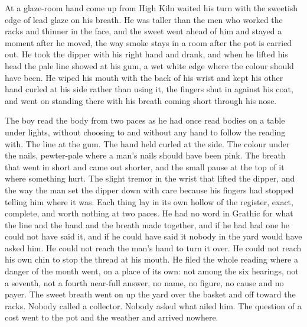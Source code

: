 \scenebreak

At  a glaze-room hand come up from High Kiln waited his turn with the sweetish edge of lead glaze on his breath. He was taller than the men who worked the racks and thinner in the face, and the sweet went ahead of him and stayed a moment after he moved, the way smoke stays in a room after the pot is carried out. He took the dipper with his right hand and drank, and when he lifted his head the pale line showed at his gum, a wet white edge where the colour should have been. He wiped his mouth with the back of his wrist and kept his other hand curled at his side rather than using it, the fingers shut in against his coat, and went on standing there with his breath coming short through his nose.

The boy read the body from two paces as he had once read bodies on a table under lights, without choosing to and without any hand to follow the reading with. The line at the gum. The hand held curled at the side. The colour under the nails, pewter-pale where a man's nails should have been pink. The breath that went in short and came out shorter, and the small pause at the top of it where something hurt. The slight tremor in the wrist that lifted the dipper, and the way the man set the dipper down with care because his fingers had stopped telling him where it was. Each thing lay in its own hollow of the register, exact, complete, and worth nothing at two paces. He had no word in Grathic for what the line and the hand and the breath made together, and if he had had one he could not have said it, and if he could have said it nobody in the yard would have asked him. He could not reach the man's hand to turn it over. He could not reach his own chin to stop the thread at his mouth. He filed the whole reading where a danger of the month went, on a place of its own: not among the six hearings, not a seventh, not a fourth near-full answer, no name, no figure, no cause and no payer. The sweet breath went on up the yard over the basket and off toward the racks. Nobody called a collector. Nobody asked what ailed him. The question of a cost went to the pot and the weather and arrived nowhere.

\scenebreak

